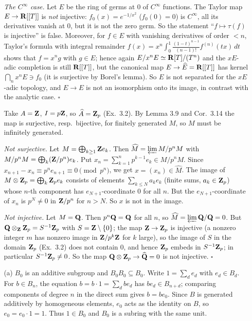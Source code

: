 \documentclass[11pt]{article}
\begin{document}
\emph{The $C^\infty$ case.} Let $E$ be the ring of germs at $0$ of $C^\infty$ functions. The Taylor map $E\to\mathbf R[[T]]$ is \emph{not} injective: $f_0(x)=e^{-1/x^2}$ ($f_0(0)=0$) is $C^\infty$, all its derivatives vanish at $0$, but it is not the zero germ. So the statement ``$f\mapsto\tau(f)$ is injective'' is false. Moreover, for $f\in E$ with vanishing derivatives of order $<n$, Taylor's formula with integral remainder $f(x)=x^n\int_0^1\frac{(1-t)^{n-1}}{(n-1)!}f^{(n)}(tx)\,dt$ shows that $f=x^ng$ with $g\in E$; hence again $E/x^nE\simeq\mathbf R[T]/(T^n)$ and the $xE$-adic completion is still $\mathbf R[[T]]$, but the canonical map $E\to\widehat{E}=\mathbf R[[T]]$ has kernel $\bigcap_nx^nE\ni f_0$ (it is surjective by Borel's lemma). So $E$ is not separated for the $xE$-adic topology, and $E\to\widehat{E}$ is not an isomorphism onto its image, in contrast with the analytic case. \hfill$\square$

\pf
Take $A=\mathbf Z$, $I=p\mathbf Z$, so $\widehat{A}=\mathbf Z_p$ (Ex.~3.2). By Lemma 3.9 and Cor.~3.14 the map is surjective, resp.\ bijective, for finitely generated $M$, so $M$ must be infinitely generated.

\emph{Not surjective.} Let $M=\bigoplus_{k\ge1}\mathbf Z e_k$. Then $\widehat{M}=\varprojlim M/p^nM$ with $M/p^nM=\bigoplus_k(\mathbf Z/p^n)e_k$. Put $x_n=\sum_{k=1}^np^{k-1}e_k\in M/p^nM$. Since $x_{n+1}-x_n\equiv p^ne_{n+1}\equiv0\pmod{p^n}$, we get $x=(x_n)\in\widehat{M}$. The image of $M\otimes\mathbf Z_p=\bigoplus_k\mathbf Z_pe_k$ consists of elements $\sum_{k\le N}a_ke_k$ (finite sums, $a_k\in\mathbf Z_p$) whose $n$-th component has $e_{N+1}$-coordinate $0$ for all $n$. But the $e_{N+1}$-coordinate of $x_n$ is $p^N\ne0$ in $\mathbf Z/p^n$ for $n>N$. So $x$ is not in the image.

\emph{Not injective.} Let $M=\mathbf Q$. Then $p^n\mathbf Q=\mathbf Q$ for all $n$, so $\widehat{M}=\varprojlim\mathbf Q/\mathbf Q=0$. But $\mathbf Q\otimes_\mathbf Z\mathbf Z_p=S^{-1}\mathbf Z_p$ with $S=\mathbf Z\setminus\{0\}$; the map $\mathbf Z\to\mathbf Z_p$ is injective (a nonzero integer $m$ has nonzero image in $\mathbf Z/p^k\mathbf Z$ for $k$ large), so the image of $S$ in the domain $\mathbf Z_p$ (Ex.~3.2) does not contain $0$, and hence $\mathbf Z_p$ embeds in $S^{-1}\mathbf Z_p$; in particular $S^{-1}\mathbf Z_p\ne0$. So the map $\mathbf Q\otimes\mathbf Z_p\to\widehat{\mathbf Q}=0$ is not injective. \hfill$\square$

\pf
(a) $B_0$ is an additive subgroup and $B_0B_0\subseteq B_0$. Write $1=\sum_de_d$ with $e_d\in B_d$. For $b\in B_n$, the equation $b=b\cdot1=\sum_dbe_d$ has $be_d\in B_{n+d}$; comparing components of degree $n$ in the direct sum gives $b=be_0$. Since $B$ is generated additively by homogeneous elements, $e_0$ acts as the identity on $B$, so $e_0=e_0\cdot1=1$. Thus $1\in B_0$ and $B_0$ is a subring with the same unit.
\end{document}
